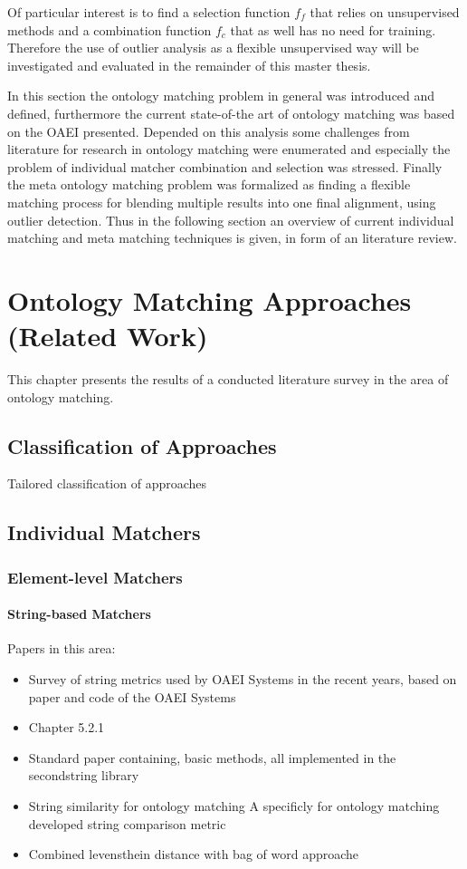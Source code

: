 \documentclass[11pt,titlepage,oneside,openany,a4paper]{report}
\begin{document}
Of particular interest is to find a selection function $f_f$ that relies on unsupervised methods and a combination function $f_c$ that as well has no need for training. Therefore the use of  outlier analysis as a flexible unsupervised way will be investigated and evaluated in the remainder of this master thesis.

In this section the ontology matching problem in general was introduced and defined, furthermore the current state-of-the art of ontology matching was based on the OAEI presented. Depended on this analysis some challenges from literature for research in ontology matching were enumerated and especially the problem of individual matcher combination and selection was stressed. Finally the meta ontology matching problem was formalized as finding a flexible matching process for blending multiple results into one final alignment, using outlier detection.  Thus in the following section an overview of current individual matching and meta matching techniques is given, in form of an literature review.
\chapter{Ontology Matching Approaches (Related Work)}
This chapter presents the results of a conducted literature survey in the area of ontology matching.
\section{Classification of Approaches}
Tailored classification of approaches
\section{Individual Matchers}

\subsection{Element-level  Matchers}
	\subsubsection{String-based Matchers}
	Papers in this area:
	\begin{itemize}
	\item Survey of string metrics used by OAEI Systems in the recent years, based on paper and code of the OAEI Systems \cite{Cheatham:2013aa}
	\item \cite{euzenat2013d} Chapter 5.2.1
	\item Standard paper containing, basic methods, all implemented in the secondstring library\cite{Cohen2003}
	\item String similarity for ontology matching \cite{Stoilos:2005}  A specificly for ontology matching developed string comparison metric
 \item Combined levensthein distance with bag of word approache \cite{Akbari2009}
	\end{itemize}	
\end{document}
